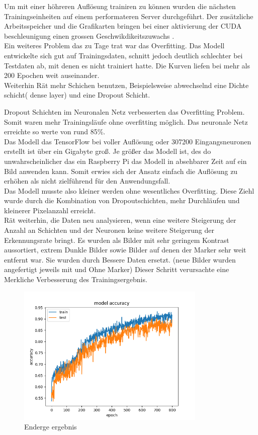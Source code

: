 \documentclass[conference]{IEEEtran}
\begin{document}
Um mit einer höhreren Auflösung trainiren zu können wurden die nächsten Trainingseinheiten auf einem performateren Server durchgeführt. Der zusätzliche Arbeitsspeicher und die Grafikarten bringen bei einer aktivierung der CUDA beschleunigung einen grossen Geschwikdikeitszuwachs . \\

Ein weiteres Problem das zu Tage trat war das Overfitting. Das Modell entwickelte sich gut auf Trainingsdaten, schnitt jedoch deutlich schlechter bei Testdaten ab, mit denen es nicht trainiert hatte. Die Kurven liefen bei mehr als 200 Epochen weit auseinander.\\


Weiterhin Rät \cite{b3} mehr Schichen benutzen, Beispielsweise abwechselnd eine Dichte schicht( dense layer) und eine Dropout Schicht.

Dropout Schichten im Neuronalen Netz verbesserten das Overfitting Problem. Somit waren mehr Trainingsläufe ohne overfitting möglich. Das neuronale Netz erreichte so werte von rund 85\%. \\

Das Modell das TensorFlow bei voller Auflösung oder 307200 Eingangsneuronen erstellt ist über ein Gigabyte groß. Je größer das Modell ist, des do unwahrscheinlicher das ein Raspberry Pi das Modell in absehbarer Zeit auf ein Bild anwenden kann. Somit erwies sich der Ansatz einfach die Auflösung zu erhöhen als nicht  zielführend für den Anwendungsfall. \\

Das Modell musste also kleiner werden ohne wesentliches Overfitting. Diese Ziehl wurde durch die Kombination von Dropoutschichten, mehr Durchläufen und kleinerer Pixelanzahl erreicht. \\

\cite{b3} Rät weiterhin, die Daten neu analysieren, wenn eine weitere Steigerung der Anzahl an Schichten und der Neuronen keine weitere Steigerung der Erkennungsrate bringt. Es wurden als Bilder mit sehr geringem Kontrast aussortiert, extrem Dunkle Bilder sowie Bilder auf denen der Marker sehr weit entfernt war. Sie wurden durch Bessere Daten ersetzt. (neue Bilder wurden angefertigt jeweils mit und Ohne Marker) Dieser Schritt verursachte eine Merkliche Verbesserung des Trainingsergebnis.
\\


\begin{figure}[!h]
	\centering
	\includegraphics[width=9cm]{img/213x160:800@32:0_accuracy.png}
	\caption{Enderge ergebnis}
	\label{end Ergenisse }
\end{figure}
\end{document}
